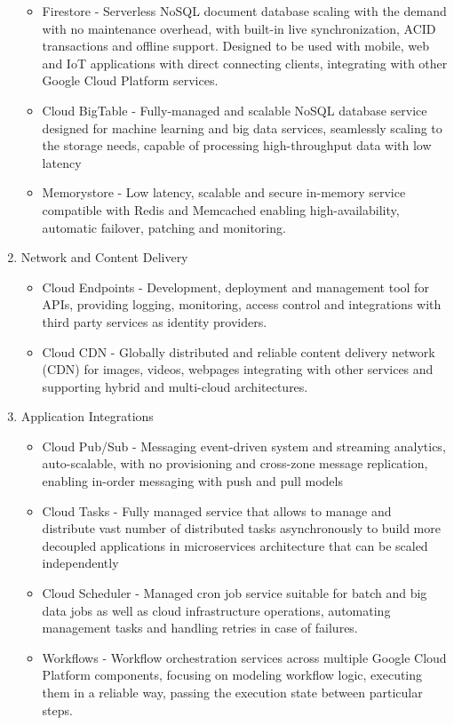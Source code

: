 \begin{enumerate}
\begin{itemize}
       \item Firestore - Serverless NoSQL document database scaling with the demand with no maintenance overhead, with built-in live synchronization, ACID transactions and offline support. Designed to be used with mobile, web and IoT applications with direct connecting clients, integrating with other Google Cloud Platform services.
       \item Cloud BigTable - Fully-managed and scalable NoSQL database service designed for machine learning and big data services, seamlessly scaling to the storage needs, capable of processing high-throughput data with low latency
       \item Memorystore - Low latency, scalable and secure in-memory service compatible with Redis and Memcached enabling high-availability, automatic failover, patching and monitoring.
   \end{itemize}
   \item Network and Content Delivery
   \begin{itemize}
       \item Cloud Endpoints - Development, deployment and management tool for APIs, providing logging, monitoring, access control and integrations with third party services as identity providers.
       \item Cloud CDN - Globally distributed and reliable content delivery network (CDN) for images, videos, webpages integrating with other services and supporting hybrid and multi-cloud architectures.
   \end{itemize}
   \item Application Integrations
   \begin{itemize}
       \item Cloud Pub/Sub - Messaging event-driven system and streaming analytics, auto-scalable, with no provisioning and cross-zone message replication, enabling in-order messaging with push and pull models
       \item Cloud Tasks - Fully managed service that allows to manage and distribute vast number of distributed tasks asynchronously to build more decoupled applications in microservices architecture that can be scaled independently
       \item Cloud Scheduler - Managed cron job service suitable for batch and big data jobs as well as cloud infrastructure operations, automating management tasks and handling retries in case of failures.
       \item Workflows - Workflow orchestration services across multiple Google Cloud Platform components, focusing on modeling workflow logic, executing them in a reliable way, passing the execution state between particular steps.

\end{itemize}
\end{enumerate}
